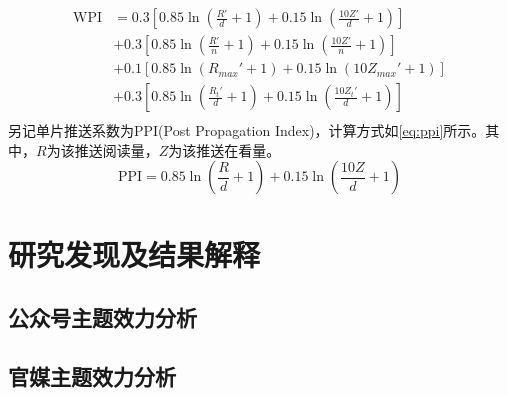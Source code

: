 \documentclass[a4paper,12pt,UTF8]{article}
\begin{document}
    \begin{equation}
      \label{eq:wpi}
      \begin{aligned}
        \text{WPI} &= 0.3\left[0.85 \ln (\frac{R'}{d} + 1)+ 0.15 \ln (\frac{10Z'}{d} + 1)\right] \\
                   &+ 0.3\left[0.85 \ln (\frac{R'}{n} + 1)+ 0.15 \ln (\frac{10Z'}{n} + 1)\right] \\
                   &+ 0.1\left[0.85 \ln (R_{max}' + 1)+ 0.15 \ln (10Z_{max}' + 1)\right] \\
                   &+ 0.3\left[0.85 \ln (\frac{R_t'}{d} + 1)+ 0.15 \ln (\frac{10Z_t'}{d} + 1)\right] \\
      \end{aligned}
    \end{equation}
    另记单片推送系数为PPI(Post Propagation Index)，计算方式如\cref{eq:ppi}所示。其中，$R$为该推送阅读量，$Z$为该推送在看量。
    \begin{equation}
      \label{eq:ppi}
      \text{PPI} = 0.85 \ln (\frac{R}{d} + 1)+ 0.15 \ln (\frac{10Z}{d} + 1)
    \end{equation}
    \section{研究发现及结果解释}
    \subsection{公众号主题效力分析}
    \subsection{官媒主题效力分析}
    
    \label{applastpage}
    \newpage
    
    

\end{document}
